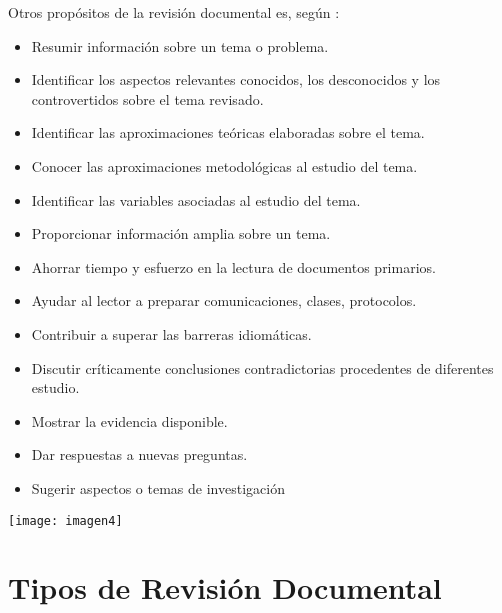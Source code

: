  Otros propósitos de la revisión documental es, según  :     
 \begin{itemize}
 	\item   Resumir información sobre un tema o problema. 
 	\item   Identificar los aspectos relevantes conocidos, los desconocidos y los controvertidos sobre el tema revisado. 
	\item   Identificar las aproximaciones teóricas elaboradas sobre el tema.
	\item 	Conocer las aproximaciones metodológicas al estudio del tema.
	\item 	Identificar las variables asociadas al estudio del tema.
	\item 	Proporcionar información amplia sobre un tema.
	\item 	Ahorrar tiempo y esfuerzo en la lectura de documentos primarios.
	\item 	Ayudar al lector a preparar comunicaciones, clases, protocolos.
	\item 	Contribuir a superar las barreras idiomáticas.
	\item 	Discutir críticamente conclusiones contradictorias procedentes de diferentes estudio.
	\item 	Mostrar la evidencia disponible.
	\item 	Dar respuestas a nuevas preguntas. 
	\item 	Sugerir aspectos o temas de investigación 
 \end{itemize}

 \begin{marginfigure}[-5cm]%
	\texttt{[image: imagen4]}
\end{marginfigure}
 
\section{Tipos de Revisi\'on Documental}

